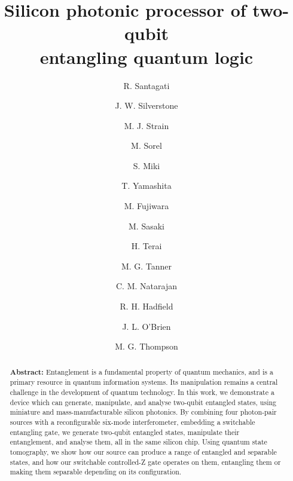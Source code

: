 \documentclass[
twocolumn,
 amsmath,amssymb,
 aps,
  twoside,
 superscriptaddress,
pra,
longbibliography
]{revtex4-1}
\def\mytitle{Silicon photonic processor of two-qubit \\entangling quantum logic}
\begin{document}
\title{\vspace{-1.0cm}\LARGE\textbf{\textrm{\color{black} \mytitle}}}



\author{R. Santagati}
 
\author{J. W. Silverstone}
\author{M. J. Strain}
\author{M. Sorel}

\author{S. Miki}
\author{T. Yamashita}

\author{M. Fujiwara}
\author{M. Sasaki}

\author{H. Terai}

\author{M. G. Tanner}
\author{C. M. Natarajan}
\author{R. H. Hadfield}

\author{J. L. O'Brien}
\author{M. G. Thompson}

\begin{abstract}

\textbf{Abstract:}
Entanglement is a fundamental property of quantum mechanics, and is a primary resource in quantum information systems. Its manipulation remains a central challenge in the development of quantum technology. In this work, we demonstrate a device which can generate, manipulate, and analyse two-qubit entangled states, using miniature and mass-manufacturable silicon photonics. By combining four photon-pair sources with a reconfigurable six-mode interferometer, embedding a switchable entangling gate, we generate two-qubit entangled states, manipulate their entanglement, and analyse them, all in the same silicon chip. Using quantum state tomography, we show how our source can produce a range of entangled and separable states, and how our switchable controlled-Z gate operates on them, entangling them or making them separable depending on its configuration.
\end{abstract}
\end{document}
